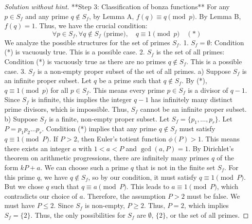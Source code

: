 \begin{proof} [Solution without hint]
**Step 3: Classification of bonza functions**
For any $p \in S_f$ and any prime $q \notin S_f$, by Lemma A, $f(q) \equiv q \pmod p$. By Lemma B, $f(q)=1$. Thus, we have the crucial condition:
$$ \forall p \in S_f, \forall q \notin S_f \text{ (prime)}, \quad q \equiv 1 \pmod p \quad (*) $$
We analyze the possible structures for the set of primes $S_f$.
1.  $S_f = \emptyset$: Condition (*) is vacuously true. This is a possible case.
2.  $S_f$ is the set of all primes: Condition (*) is vacuously true as there are no primes $q \notin S_f$. This is a possible case.
3.  $S_f$ is a non-empty proper subset of the set of all primes.
    a) Suppose $S_f$ is an infinite proper subset. Let $q$ be a prime such that $q \notin S_f$. By (*), $q \equiv 1 \pmod p$ for all $p \in S_f$. This means every prime $p \in S_f$ is a divisor of $q-1$. Since $S_f$ is infinite, this implies the integer $q-1$ has infinitely many distinct prime divisors, which is impossible. Thus, $S_f$ cannot be an infinite proper subset.
    b) Suppose $S_f$ is a finite, non-empty proper subset. Let $S_f = \{p_1, \dots, p_r\}$. Let $P = p_1 p_2 \dots p_r$. Condition (*) implies that any prime $q \notin S_f$ must satisfy $q \equiv 1 \pmod P$.
    If $P > 2$, then Euler's totient function $\phi(P) > 1$. This means there exists an integer $a$ with $1 < a < P$ and $\gcd(a, P)=1$. By Dirichlet's theorem on arithmetic progressions, there are infinitely many primes $q$ of the form $kP+a$. We can choose such a prime $q$ that is not in the finite set $S_f$. For this prime $q$, we have $q \notin S_f$, so by our condition, it must satisfy $q \equiv 1 \pmod P$. But we chose $q$ such that $q \equiv a \pmod P$. This leads to $a \equiv 1 \pmod P$, which contradicts our choice of $a$.
    Therefore, the assumption $P>2$ must be false. We must have $P \le 2$.
    Since $S_f$ is non-empty, $P \ge 2$. Thus, $P=2$, which implies $S_f=\{2\}$.
Thus, the only possibilities for $S_f$ are $\emptyset$, $\{2\}$, or the set of all primes.


\end{proof}
